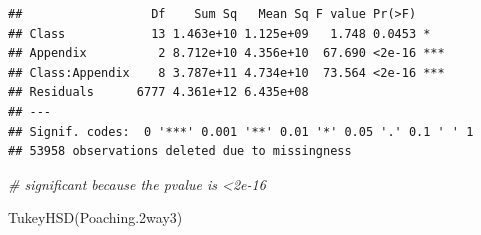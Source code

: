 \documentclass[
  12pt,
]{article}
\newenvironment{Shaded}{\begin{snugshade}}{\end{snugshade}}
\newcommand{\CommentTok}[1]{\textcolor[rgb]{0.56,0.35,0.01}{\textit{#1}}}
\newcommand{\FloatTok}[1]{\textcolor[rgb]{0.00,0.00,0.81}{#1}}
\newcommand{\FunctionTok}[1]{\textcolor[rgb]{0.00,0.00,0.00}{#1}}
\newcommand{\NormalTok}[1]{#1}
\begin{document}
\begin{verbatim}
##                  Df    Sum Sq   Mean Sq F value Pr(>F)    
## Class            13 1.463e+10 1.125e+09   1.748 0.0453 *  
## Appendix          2 8.712e+10 4.356e+10  67.690 <2e-16 ***
## Class:Appendix    8 3.787e+11 4.734e+10  73.564 <2e-16 ***
## Residuals      6777 4.361e+12 6.435e+08                   
## ---
## Signif. codes:  0 '***' 0.001 '**' 0.01 '*' 0.05 '.' 0.1 ' ' 1
## 53958 observations deleted due to missingness
\end{verbatim}

\begin{Shaded}
\begin{Highlighting}[]
\CommentTok{\# significant because the pvalue is \textless{}2e{-}16}

\FunctionTok{TukeyHSD}\NormalTok{(Poaching}\FloatTok{.2}\NormalTok{way3)}
\end{Highlighting}
\end{Shaded}
\end{document}
